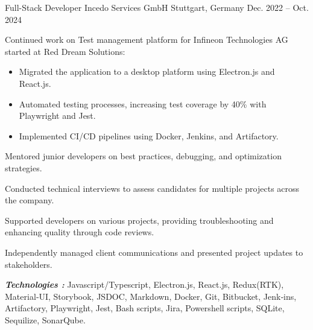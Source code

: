 

\begin{cventries}

  \cventry
    {Full-Stack Developer} %
    {Incedo Services GmbH} %
    {Stuttgart, Germany} %
    {Dec. 2022 – Oct. 2024} %
    {
      \begin{cvitems} %
        \item {Continued work on Test management platform for Infineon Technologies AG started at Red Dream Solutions:
        \begin{itemize}
          \item{Migrated the application to a desktop platform using Electron.js and React.js.}
          \item{Automated testing processes, increasing test coverage by 40\% with Playwright and Jest.}
          \item{Implemented CI/CD pipelines using Docker, Jenkins, and Artifactory.}
        \end{itemize}
        }
        \item {Mentored junior developers on best practices, debugging, and optimization strategies.}
        \item {Conducted technical interviews to assess candidates for multiple projects across the company.}
        \item {Supported developers on various projects, providing troubleshooting and enhancing quality through code reviews.}
        \item {Independently managed client communications and presented project updates to stakeholders.}
       \end{cvitems}
       \vspace{5mm}
      \textbf{\textit{Technologies :}} Javascript/Typescript, Electron.js, React.js, Redux(RTK), Material‐UI,
       Storybook, JSDOC, Markdown, Docker, Git, Bitbucket, Jenk‐ins, Artifactory,
        Playwright, Jest, Bash scripts, Jira, Powershell scripts, SQLite, Sequilize, SonarQube.
      \vspace{5mm}
    }


\end{cventries}
